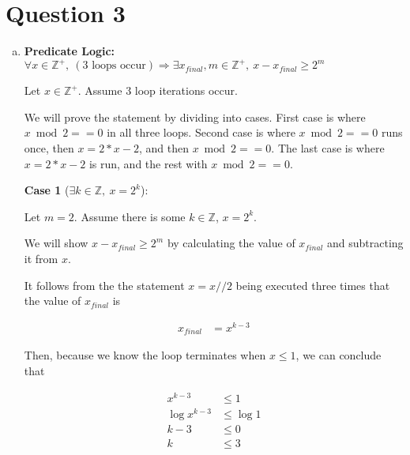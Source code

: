 \documentclass[12pt]{article}
\begin{document}
\section*{Question 3}
\begin{enumerate}[a.]
    \item

    \textbf{Predicate Logic:} $\forall x \in \mathbb{Z}^{+},\:(\text{3 loops occur})
    \Rightarrow \exists x_{final},m \in \mathbb{Z}^{+},\:x - x_{final} \geq 2^m$

    \bigskip

    Let $x \in \mathbb{Z}^{+}$. Assume 3 loop iterations occur.

    \bigskip

    We will prove the statement by dividing into cases. First case is where
    $x \bmod 2 == 0$ in all three loops. Second case is where $x \bmod 2 ==0$
    runs once, then $x = 2*x - 2$, and then $x \bmod 2 ==0$. The last case is where
    $x = 2*x - 2$ is run, and the rest with $x \bmod 2 == 0$.

    \bigskip

    \textbf{Case 1} ($\exists k \in \mathbb{Z},\:x = 2^k$):

    \bigskip

    Let $m = 2$. Assume there is some $k \in \mathbb{Z}$, $x = 2^k$.

    \bigskip

    We will show $x - x_{final} \geq 2^m$ by calculating the value of $x_{final}$
    and subtracting it from $x$.

    \bigskip

    It follows from the the statement $x = x // 2$ being executed three
    times that the value of $x_{final}$ is

    \setcounter{equation}{0}
    \begin{align}
        x_{final} &= x^{k-3}
    \end{align}

    \bigskip

    Then, because we know the loop terminates when $x \leq 1$, we can conclude that

    \begin{align}
        x^{k-3} &\leq 1\\
        \log x^{k-3} &\leq \log 1\\
        k-3 &\leq 0\\
        k &\leq 3
    \end{align}


\end{enumerate}
\end{document}
